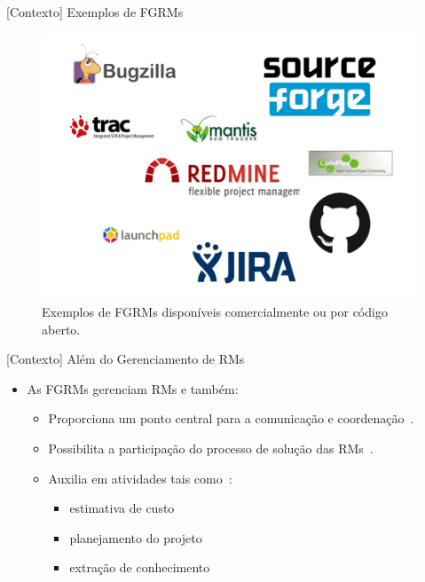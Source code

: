 \documentclass[t,14pt,mathserif]{beamer}
\begin{document}
\begin{frame}{[Contexto] Exemplos de FGRMs}
		\begin{figure}[hbtp]
			\centering
			\includegraphics[scale=.3]{../img/issue-tracking-sytem.png}
            \caption{Exemplos de FGRMs disponíveis comercialmente ou por código
                    aberto.}\label{fig:emacs_num_rm_por_ano}
		\end{figure}
\end{frame}

\begin{frame}{[Contexto] Além do Gerenciamento de RMs}
    \begin{itemize}
        \item As FGRMs gerenciam RMs e também:

            \begin{itemize}
                \item Proporciona um ponto central para a comunicação e
                      coordenação~\cite{Bertram:2010:CCB:1718918.1718972}.
                \item Possibilita a participação do processo de solução das
                      RMs~\cite{Breu:2010:INB:1718918.1718973}.
                \item Auxilia em atividades tais como~\cite{cavalcanti2013bug}:
                    \begin{itemize}
                        \item estimativa de custo
                        \item planejamento do projeto
                        \item extração de conhecimento
                    \end{itemize}
              \end{itemize}
    \end{itemize}
\end{frame}
\end{document}

